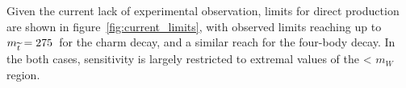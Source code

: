 Given the current lack of experimental observation, limits for direct \sTop
production are shown in figure~\ref{fig:current_limits}, with observed limits
reaching up to $m_{\widetilde{t}} = 275$~\gev for the charm decay, and a similar reach
for the four-body decay. In the both cases, sensitivity is largely restricted to
extremal \deltam values of the \deltam < $m_W$ region.